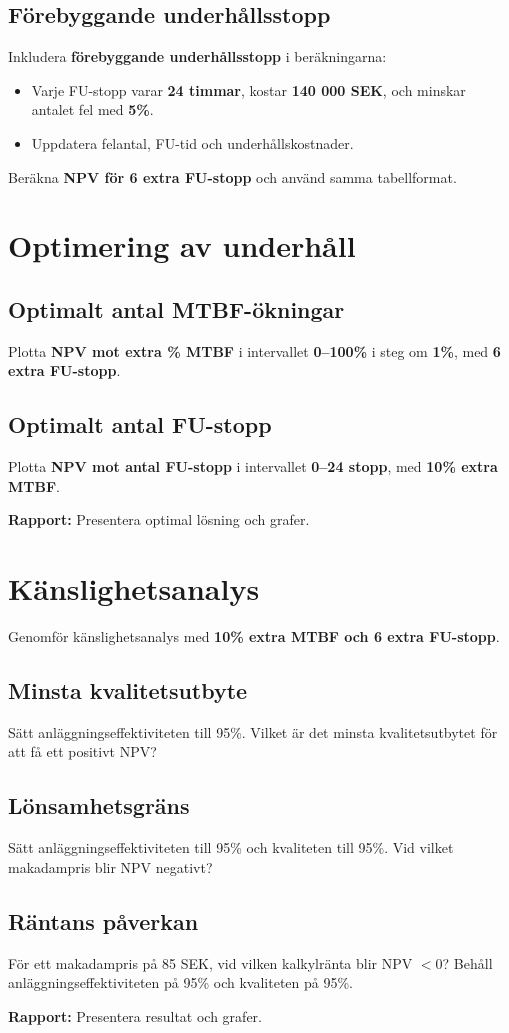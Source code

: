 \documentclass[a4paper,12pt]{exam}
\begin{document}
\subsection{Förebyggande underhållsstopp}
Inkludera \textbf{förebyggande underhållsstopp} i beräkningarna:
\begin{itemize}
    \item Varje FU-stopp varar \textbf{24 timmar}, kostar \textbf{140 000 SEK}, och minskar antalet fel med \textbf{5\%}.
    \item Uppdatera felantal, FU-tid och underhållskostnader.
\end{itemize}
Beräkna \textbf{NPV för 6 extra FU-stopp} och använd samma tabellformat.

\section{Optimering av underhåll}
\subsection{Optimalt antal MTBF-ökningar}
Plotta \textbf{NPV mot extra \% MTBF} i intervallet \textbf{0–100\%} i steg om \textbf{1\%}, med \textbf{6 extra FU-stopp}.

\subsection{Optimalt antal FU-stopp}
Plotta \textbf{NPV mot antal FU-stopp} i intervallet \textbf{0–24 stopp}, med \textbf{10\% extra MTBF}.

\textbf{Rapport:} Presentera optimal lösning och grafer.

\section{Känslighetsanalys}
Genomför känslighetsanalys med \textbf{10\% extra MTBF och 6 extra FU-stopp}.

\subsection{Minsta kvalitetsutbyte}
Sätt anläggningseffektiviteten till 95\%. Vilket är det minsta kvalitetsutbytet för att få ett positivt NPV?

\subsection{Lönsamhetsgräns}
Sätt anläggningseffektiviteten till 95\% och kvaliteten till 95\%. Vid vilket makadampris blir NPV negativt?

\subsection{Räntans påverkan}
För ett makadampris på 85 SEK, vid vilken kalkylränta blir NPV $<0$? Behåll anläggningseffektiviteten på 95\% och kvaliteten på 95\%.

\textbf{Rapport:} Presentera resultat och grafer.
\end{document}
